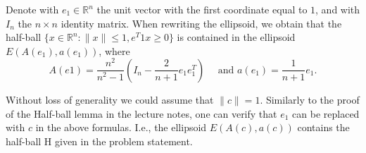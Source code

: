 \documentclass[11pt]{article}
\newcommand{\setR}{\mathbb{R}}
\begin{document}
\begin{enumerate}[1)]
\begin{solution}
Denote with $e_1 ∈\setR^n$ the unit vector with the first coordinate equal to $1$, and with $I_n$ the $n×n$
identity matrix. When rewriting the ellipsoid, we
obtain that the half-ball $\{x∈\setR^n :∥x∥≤1, e^T1 x≥0\}$ is contained in the ellipsoid
$E(A(e_1),a(e_1))$, where $$A(e1) = \frac{n^2}{n^2 -1}\left(I_n - \frac{2}{n+1}e_1e_1^T\right) \quad \text{ and } a(e_1) = \frac{1}{n+1}e_1.$$

Without loss of generality we could assume that $∥c∥= 1$. Similarly to the proof of the Half-ball
lemma in the lecture notes, one can verify that $e_1$ can be replaced with $c$ in the above formulas.
I.e., the ellipsoid $E(A(c),a(c))$ contains the half-ball H given in the problem statement.

 
 \end{solution}



  





\end{enumerate}




  
\end{document}
